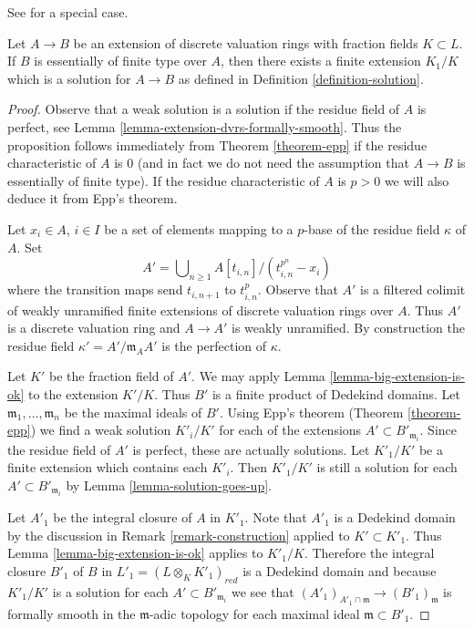\begin{proposition}
\label{proposition-epp-essentially-finite-type}
\begin{reference}
See \cite[Lemma 2.13]{alterations} for a special case.
\end{reference}
Let $A \to B$ be an extension of discrete valuation rings with fraction
fields $K \subset L$. If $B$ is essentially of finite type over $A$, then
there exists a finite extension $K_1/K$ which is a solution for
$A \to B$ as defined in
Definition \ref{definition-solution}.
\end{proposition}

\begin{proof}
Observe that a weak solution is a solution if the residue field of $A$
is perfect, see Lemma \ref{lemma-extension-dvrs-formally-smooth}.
Thus the proposition follows immediately from Theorem \ref{theorem-epp}
if the residue characteristic of $A$ is $0$ (and in fact we do not need
the assumption that $A \to B$ is essentially of finite type).
If the residue characteristic of $A$ is $p > 0$ we will also deduce it from
Epp's theorem.

\medskip\noindent
Let $x_i \in A$, $i \in I$ be a set of elements mapping to a $p$-base of
the residue field $\kappa$ of $A$. Set
$$
A' = \bigcup\nolimits_{n \geq 1} A[t_{i, n}]/(t_{i, n}^{p^n} - x_i)
$$
where the transition maps send $t_{i, n + 1}$ to $t_{i, n}^p$. Observe
that $A'$ is a filtered colimit of weakly unramified finite extensions
of discrete valuation rings over $A$. Thus $A'$ is a discrete valuation
ring and $A \to A'$ is weakly unramified. By construction the residue field
$\kappa' = A'/\mathfrak m_A A'$ is the perfection of $\kappa$.

\medskip\noindent
Let $K'$ be the fraction field of $A'$.
We may apply Lemma \ref{lemma-big-extension-is-ok}
to the extension $K'/K$. Thus $B'$ is a finite product of
Dedekind domains. Let $\mathfrak m_1, \ldots, \mathfrak m_n$ be the
maximal ideals of $B'$. Using Epp's theorem (Theorem \ref{theorem-epp})
we find a weak solution $K'_i/K'$ for each of the
extensions $A' \subset B'_{\mathfrak m_i}$. Since the residue field
of $A'$ is perfect, these are actually solutions. Let $K'_1/K'$
be a finite extension which contains each $K'_i$. Then $K'_1/K'$
is still a solution for each $A' \subset B'_{\mathfrak m_i}$ by
Lemma \ref{lemma-solution-goes-up}.

\medskip\noindent
Let $A'_1$ be the integral closure of $A$ in $K'_1$. Note that
$A'_1$ is a Dedekind domain by the discussion in
Remark \ref{remark-construction} applied to $K' \subset K'_1$.
Thus Lemma \ref{lemma-big-extension-is-ok} applies to $K'_1/K$.
Therefore the integral closure $B'_1$ of $B$ in
$L'_1 = (L \otimes_K K'_1)_{red}$ is a Dedekind domain and because
$K'_1/K'$ is a solution for each $A' \subset B'_{\mathfrak m_i}$
we see that $(A'_1)_{A'_1 \cap \mathfrak m} \to (B'_1)_{\mathfrak m}$
is formally smooth in the $\mathfrak m$-adic topology
for each maximal ideal $\mathfrak m \subset B'_1$.


\end{proof}
